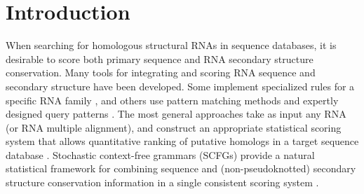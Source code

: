 \section{Introduction}

When searching for homologous structural RNAs in sequence databases,
it is desirable to score both primary sequence and RNA secondary
structure conservation. Many tools for integrating and scoring RNA
sequence and secondary structure have been developed. Some implement
specialized rules for a specific RNA family
\citep{LoweEddy97,Laslett04,LoweEddy99,Schattner06,Lai03,Lim03,Regalia02},
and others use pattern matching methods and expertly designed query
patterns \citep{Macke01}. The most general approaches take as input
any RNA (or RNA multiple alignment), and construct an appropriate
statistical scoring system that allows quantitative ranking of
putative homologs in a target sequence database
\citep{Gautheret01,ZhangBafna05,Huang08}.  Stochastic context-free
grammars (SCFGs) provide a natural statistical framework for combining
sequence and (non-pseudoknotted) secondary structure conservation
information in a single consistent scoring system
\citep{Sakakibara94c,Eddy94,Brown00,Durbin98}.



